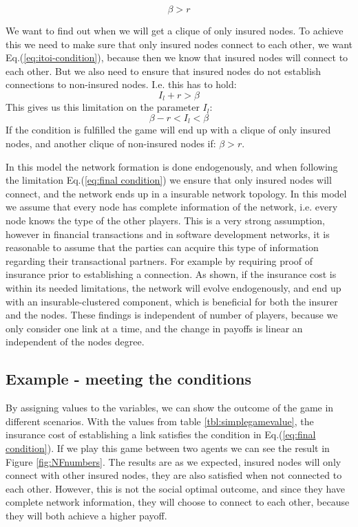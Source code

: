 \begin{equation}
\beta>r
\label{eq:notitonoti-condition}
\end{equation}

We want to find out when we will get a clique of only insured nodes.
To achieve this we need to make sure that only insured nodes connect to each other, we want Eq.(\ref{eq:itoi-condition}), because then we know that insured nodes will connect to each other. But we also need to ensure that insured nodes do not establish connections to non-insured nodes. I.e. this has to hold:
\begin{equation}
I_{l}+r>\beta
\end{equation}
This gives us this limitation on the parameter $I_{l}$:
\begin{equation}
\beta-r<I_{l}<\beta
\label{eq:final condition}
\end{equation}
If the condition is fulfilled the game will end up with a clique of only insured nodes, and another clique of non-insured nodes if: $\beta>r$. 

In this model the network formation is done endogenously, and when following the limitation Eq.(\ref{eq:final condition}) we ensure that only insured nodes will connect, and the network ends up in a insurable network topology. 
In this model we assume that every node has complete information of the network, i.e. every node knows the type of the other players. This is a very strong assumption, however in financial transactions and in software development networks, it is reasonable to assume that the parties can acquire this type of information regarding their transactional partners. For example by requiring proof of insurance prior to establishing a connection. 
As shown, if the insurance cost is within its needed limitations, the network will evolve endogenously, and end up with an insurable-clustered component, which is beneficial for both the insurer and the nodes.
These findings is independent of number of players, because we only consider one link at a time, and the change in payoffs is linear an independent of the nodes degree.


\subsection{Example - meeting the conditions}
By assigning values to the variables, we can show the outcome of the game in different scenarios. With the values from table \ref{tbl:simplegamevalue}, the insurance cost of establishing a link satisfies the condition in Eq.(\ref{eq:final condition}).
If we play this game between two agents we can see the result in Figure \ref{fig:NFnumbers}. 
The results are as we expected, insured nodes will only connect with other insured nodes, they are also satisfied when not connected to each other. However, this is not the social optimal outcome, and since they have complete network information, they will choose to connect to each other, because they will both achieve a higher payoff.


